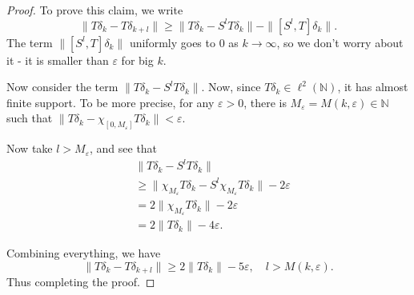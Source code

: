 \begin{proof}
To prove this claim, we write
\[
	\|T \delta_k - T \delta_{k + l}\|
	\ge 
	\|T \delta_k - S^l T \delta_k\| - \|[S^l, T] \delta_k\|
.\] 
The term $\|[S^l, T] \delta_k\|$ uniformly goes to $0$ as $k \to \infty $, so we don't worry about it - it is smaller than $\varepsilon$ for big $k$. 

Now consider the term $\|T \delta_k - S^l T \delta_k\|$. Now, since $T \delta_k \in \ell^2(\mathbb{N})$, it has almost finite support. To be more precise, for any  $\varepsilon>0$, there is $M_\varepsilon = M(k, \varepsilon) \in \mathbb{N}$ such that $\|T \delta_k -  \chi_{[0,M_\varepsilon]} T \delta_k\| < \varepsilon$. 

Now take $l > M_\varepsilon$, and see that
\begin{align*}
	&\|T \delta_k - S^l T \delta_k\|\\
	&\geq \|\chi_{M_\varepsilon} T\delta_k - S^l \chi_{M_\varepsilon} T \delta_k\| - 2 \varepsilon \\
	&= 2 \|\chi_{M_\varepsilon} T \delta_k\| - 2 \varepsilon \\
	&= 2 \|T \delta_k\| - 4 \varepsilon
.\end{align*}

Combining everything, we have
\[
	\|T \delta_k - T \delta_{k + l}\| \ge 2 \|T \delta_k\| - 5 \varepsilon, \quad l > M(k, \varepsilon)
.\] 
Thus completing the proof.
\end{proof}



